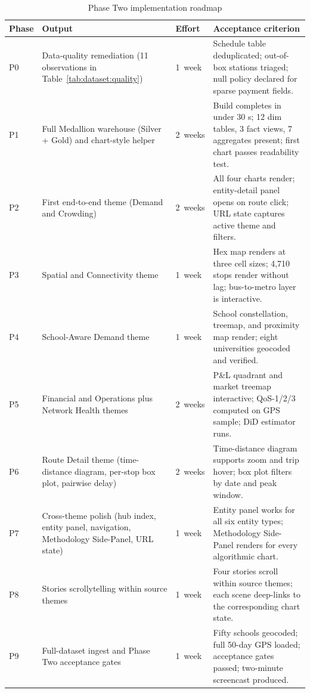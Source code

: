 \begin{table}[!htbp]
  \centering
  \caption{Phase Two implementation roadmap}
  \label{tab:future:roadmap}
  \footnotesize
  \renewcommand{\arraystretch}{1.25}
  \begin{tabularx}{\linewidth}{p{0.7cm}p{4.6cm}p{1.5cm}X}
    \hline
    \textbf{Phase} & \textbf{Output} & \textbf{Effort} & \textbf{Acceptance criterion} \\
    \hline
    P0 & Data-quality remediation (11 observations in Table~\ref{tab:dataset:quality})
       & 1~week
       & Schedule table deduplicated; out-of-box stations triaged; null policy declared for sparse payment fields. \\
    P1 & Full Medallion warehouse (Silver + Gold) and chart-style helper
       & 2~weeks
       & Build completes in under 30 s; 12 dim tables, 3 fact views, 7 aggregates present; first chart passes readability test. \\
    P2 & First end-to-end theme (Demand and Crowding)
       & 2~weeks
       & All four charts render; entity-detail panel opens on route click; URL state captures active theme and filters. \\
    P3 & Spatial and Connectivity theme
       & 1~week
       & Hex map renders at three cell sizes; 4{,}710 stops render without lag; bus-to-metro layer is interactive. \\
    P4 & School-Aware Demand theme
       & 1~week
       & School constellation, treemap, and proximity map render; eight universities geocoded and verified. \\
    P5 & Financial and Operations plus Network Health themes
       & 2~weeks
       & P\&L quadrant and market treemap interactive; QoS-1/2/3 computed on GPS sample; DiD estimator runs. \\
    P6 & Route Detail theme (time-distance diagram, per-stop box plot, pairwise delay)
       & 2~weeks
       & Time-distance diagram supports zoom and trip hover; box plot filters by date and peak window. \\
    P7 & Cross-theme polish (hub index, entity panel, navigation, Methodology Side-Panel, URL state)
       & 1~week
       & Entity panel works for all six entity types; Methodology Side-Panel renders for every algorithmic chart. \\
    P8 & Stories scrollytelling within source themes
       & 1~week
       & Four stories scroll within source themes; each scene deep-links to the corresponding chart state. \\
    P9 & Full-dataset ingest and Phase Two acceptance gates
       & 1~week
       & Fifty schools geocoded; full 50-day GPS loaded; acceptance gates passed; two-minute screencast produced. \\
    \hline
  \end{tabularx}
\end{table}

